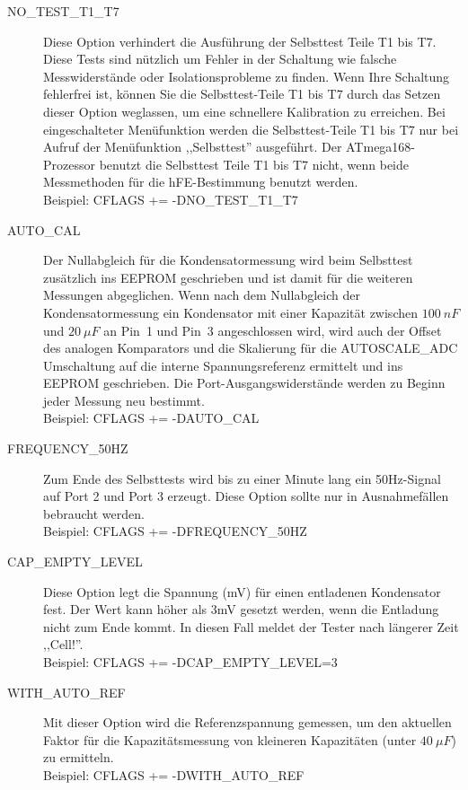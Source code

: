 \begin{description}
  \item[NO\_TEST\_T1\_T7] Diese Option verhindert die Ausführung der Selbsttest Teile T1 bis T7.
Diese Tests sind nützlich um Fehler in der Schaltung wie falsche Messwiderstände oder Isolationsprobleme zu finden.
Wenn Ihre Schaltung fehlerfrei ist, können Sie die Selbsttest-Teile T1 bis T7 durch das Setzen dieser Option weglassen, um eine
schnellere Kalibration zu erreichen.
Bei eingeschalteter Menüfunktion werden die Selbsttest-Teile T1 bis T7 nur bei Aufruf der Menüfunktion ,,Selbsttest'' ausgeführt.
Der ATmega168-Prozessor benutzt die Selbsttest Teile T1 bis T7 nicht, wenn beide Messmethoden für die hFE-Bestimmung benutzt werden.\\
Beispiel: CFLAGS += -DNO\_TEST\_T1\_T7

  \item[AUTO\_CAL] Der Nullabgleich für die Kondensatormessung wird beim
Selbsttest zusätzlich ins EEPROM geschrieben und ist damit für die weiteren Messungen abgeglichen.
Wenn nach dem Nullabgleich der Kondensatormessung ein Kondensator mit einer Kapazität zwischen \(100~nF\) und \(20~\mu F\) an Pin~1 und Pin~3 
angeschlossen wird, wird auch der Offset des analogen Komparators und die Skalierung für die AUTOSCALE\_ADC
Umschaltung auf die interne Spannungsreferenz ermittelt und ins EEPROM geschrieben.
Die Port-Ausgangswiderstände werden zu Beginn jeder Messung neu bestimmt. \\
Beispiel: CFLAGS += -DAUTO\_CAL

  \item[FREQUENCY\_50HZ] Zum Ende des Selbsttests wird bis zu einer Minute lang ein 50Hz-Signal auf Port 2 und Port 3 erzeugt.
Diese Option sollte nur in Ausnahmefällen bebraucht werden.\\
Beispiel: CFLAGS += -DFREQUENCY\_50HZ

  \item[CAP\_EMPTY\_LEVEL] Diese Option legt die Spannung (mV) für einen entladenen Kondensator fest.
Der Wert kann höher als 3mV gesetzt werden, wenn die Entladung nicht zum Ende kommt. In diesen Fall meldet der Tester nach längerer Zeit ,,Cell!''.\\
Beispiel: CFLAGS += -DCAP\_EMPTY\_LEVEL=3

  \item[WITH\_AUTO\_REF] Mit dieser Option wird die Referenzspannung gemessen, um den aktuellen Faktor für die Kapazitätsmessung 
von kleineren Kapazitäten (unter \(40~\mu F\)) zu ermitteln.\\
Beispiel: CFLAGS += -DWITH\_AUTO\_REF


\end{description}
